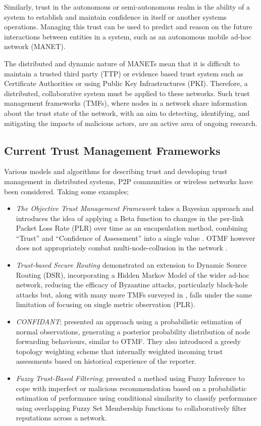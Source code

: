 \documentclass[runningheads,a4paper]{llncs}
\begin{document}
Similarly, trust in the autonomous or semi-autonomous realm is the ability of a system to establish and maintain confidence in itself or another systems operations. 
Managing this trust can be used to predict and reason on the future interactions between entities in a system, such as an autonomous mobile ad-hoc network (MANET).

The distributed and dynamic nature of MANETs mean that it is difficult to maintain a trusted third party (TTP) or evidence based trust system such as Certificate Authorities or using Public Key Infrastructures (PKI).
Therefore, a distributed, collaborative system must be applied to these networks.
Such trust management frameworks (TMFs), where nodes in a network share information about the trust state of the network, with an aim to detecting, identifying, and mitigating the impacts of malicious actors, are an active area of ongoing research.

\subsection{Current Trust Management Frameworks}

Various models and algorithms for describing trust and developing trust management in distributed systems, P2P communities or wireless networks have been considered.
Taking some examples;

\begin{itemize}
  \item \emph{The Objective Trust Management Framework} takes a Bayesian approach and introduces the idea of applying a Beta function to changes in the per-link Packet Loss Rate (PLR) over time as an encapsulation method, combining ``Trust'' and ``Confidence of Assessment'' into a single value \cite{Li2008}.
    OTMF however does not appropriately combat multi-node-collusion in the network \cite{Cho2011}.
  \item \emph{Trust-based Secure Routing \cite{Moe2008a}} demonstrated an extension to Dynamic Source Routing (DSR), incorporating a Hidden Markov Model of the wider ad-hoc network, reducing the efficacy of Byzantine attacks, particularly black-hole attacks but, along with many more TMFs surveyed in \cite{Cho2011}, falls under the same limitation of focusing on single metric observation (PLR).
  \item \emph{CONFIDANT}; \cite{Buchegger2002} presented an approach using a probabilistic estimation of normal observations, generating a posterior probability distribution of node forwarding behaviours, similar to OTMF. They also introduced a greedy topology weighting scheme that internally weighted incoming trust assessments based on historical experience of the reporter.
  \item \emph{Fuzzy Trust-Based Filtering}; \cite{Luo2008} presented a method using Fuzzy Inference to cope with imperfect or malicious recommendation based on a probabilistic estimation of performance using conditional similarity to classify performance using overlapping Fuzzy Set Membership functions to collaboratively filter reputations across a network.
\end{itemize}
\end{document}
